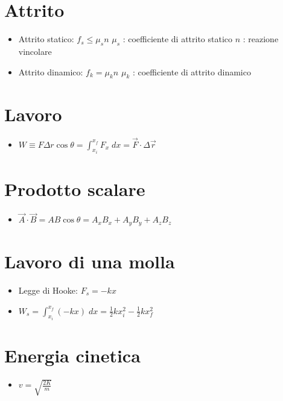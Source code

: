 \documentclass[a4paper,14pt,landscape]{extarticle}
\begin{document}
\begin{multicols*}{2}
    \section*{Attrito}
    \begin{itemize}
        \item Attrito statico: $f_s \leq \mu_s n$ \newline
              $\mu_s$ : coefficiente di attrito statico \newline
              $n$ : reazione vincolare
        \item Attrito dinamico: $f_k = \mu_k n$ \newline
              $\mu_k$ : coefficiente di attrito dinamico
    \end{itemize}

    \section*{Lavoro}
    \begin{itemize}
        \item $W \equiv F \Delta r \cos{\theta} = \int_{x_i}^{x_f} F_x \; dx = \vec{F} \cdot \Delta \vec{r}$
    \end{itemize}

    \section*{Prodotto scalare}
    \begin{itemize}
        \item $\vec{A} \cdot \vec{B} = AB\cos{\theta} = A_xB_x + A_yB_y + A_zB_z$
    \end{itemize}

    \section*{Lavoro di una molla}
    \begin{itemize}
        \item Legge di Hooke: $F_s = -kx$
        \item $W_s = \int_{x_i}^{x_f} (-kx) \; dx = \tfrac{1}{2}kx_i^2 - \tfrac{1}{2}kx_f^2$
    \end{itemize}

    \section*{Energia cinetica}
    \begin{itemize}
        \item $v = \sqrt{\tfrac{2K}{m}}$
    \end{itemize}


\end{multicols*}
\end{document}
